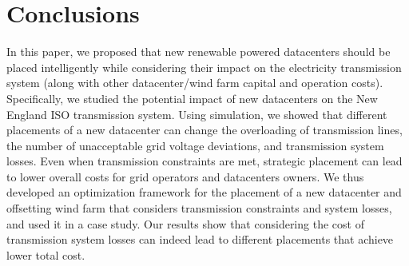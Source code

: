 \section{Conclusions}
\label{sec:conclusion}

In this paper, we proposed that new renewable powered datacenters
should be placed intelligently while considering their impact on the
electricity transmission system (along with other datacenter/wind farm
capital and operation costs).  Specifically, we studied the potential
impact of new datacenters on the New England ISO transmission system.
Using simulation, we showed that different placements of a new
datacenter can change the overloading of transmission lines, the
number of unacceptable grid voltage deviations, and transmission
system losses.
Even when transmission constraints are met,
strategic placement can lead to lower overall costs for grid operators
and datacenters owners.  We thus developed an optimization framework for
the placement of a new datacenter and offsetting wind farm that
considers transmission constraints and system losses, and used it in a
case study.  Our results show that considering the cost of
transmission system losses can indeed lead to different placements
that achieve lower total cost.

